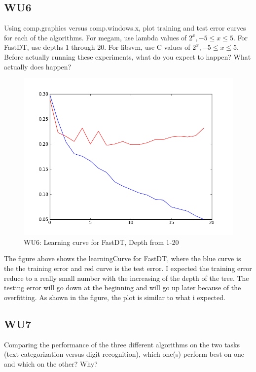 \documentclass[a4paper,11pt]{article}
\begin{document}
\subsection{WU6}
\textsf{Using comp.graphics versus comp.windows.x, plot training 
and test error curves for each of the algorithms. 
For megam, use lambda values of $2^x, -5 \leq x \leq 5$. 
For FastDT, use depths 1 through 20. 
For libsvm, use C values of $2^x,  -5 \leq x \leq 5$. 
Before actually running these experiments, what do you expect to happen? 
What actually does happen?}\\

\begin{figure}[!ht]
  \centering
  \includegraphics[width=4.5in]{WU6/learningCurve_FastDT.png}
  \caption{WU6: Learning curve for FastDT, Depth from 1-20}
\end{figure}

The figure above shows the learningCurve for FastDT, where the blue curve is the the training error and red curve is the test error. I expected the training error reduce to a really small number with the increasing of the depth of the tree. The testing error will go down at the beginning and will go up later because of the overfitting. As shown in the figure, the plot is similar to what i expected.

\subsection{WU7}
\textsf{Comparing the performance of the three different algorithms 
on the two tasks (text categorization versus digit recognition), 
which one(s) perform best on one and which on the other? Why?}\\
\end{document}
